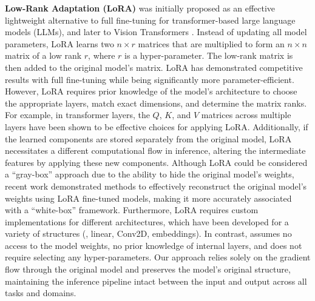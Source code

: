 {\bf Low-Rank Adaptation (LoRA)} \citep{lora} was initially proposed as an effective lightweight alternative to full fine-tuning for transformer-based large language models (LLMs), and later to Vision Transformers \citep{ViT,lora-vit}. Instead of updating all model parameters, LoRA learns two $n \times r$ matrices that are multiplied to form an $n \times n$ matrix of a low rank $r$, where $r$ is a hyper-parameter. The low-rank matrix is then added to the original model's matrix. LoRA has demonstrated competitive results with full fine-tuning while being significantly more parameter-efficient. However, LoRA requires prior knowledge of the model's architecture to choose the appropriate layers, match exact dimensions, and determine the matrix ranks. For example, in transformer layers, the $Q$, $K$, and $V$ matrices across multiple layers have been shown to be effective choices for applying LoRA. Additionally, if the learned components are stored separately from the original model, LoRA necessitates a different computational flow in inference, altering the intermediate features by applying these new components. Although LoRA could be considered a ``gray-box'' approach due to the ability to hide the original model's weights, recent work \citep{horwitz2024recovering} demonstrated methods to effectively reconstruct the original model's weights using LoRA fine-tuned models, making it more accurately associated with a ``white-box'' framework. Furthermore, LoRA requires custom implementations for different architectures, which have been developed for a variety of structures (\eg, linear, Conv2D, embeddings). In contrast, \ours assumes no access to the model weights, no prior knowledge of internal layers, and does not require selecting any hyper-parameters. Our approach relies solely on the gradient flow through the original model and preserves the model's original structure, maintaining the inference pipeline intact between the input and output across all tasks and domains.

